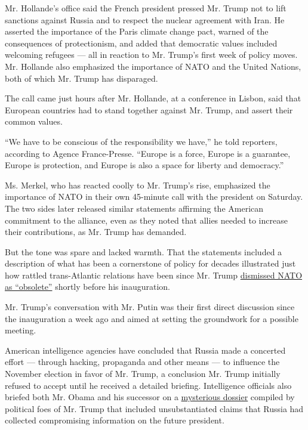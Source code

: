 Mr. Hollande's office said the French president pressed Mr. Trump not to
lift sanctions against Russia and to respect the nuclear agreement with
Iran. He asserted the importance of the Paris climate change pact,
warned of the consequences of protectionism, and added that democratic
values included welcoming refugees --- all in reaction to Mr. Trump's
first week of policy moves. Mr. Hollande also emphasized the importance
of NATO and the United Nations, both of which Mr. Trump has disparaged.

The call came just hours after Mr. Hollande, at a conference in Lisbon,
said that European countries had to stand together against Mr. Trump,
and assert their common values.

``We have to be conscious of the responsibility we have,'' he told
reporters, according to Agence France-Presse. ``Europe is a force,
Europe is a guarantee, Europe is protection, and Europe is also a space
for liberty and democracy.''

Ms. Merkel, who has reacted coolly to Mr. Trump's rise, emphasized the
importance of NATO in their own 45-minute call with the president on
Saturday. The two sides later released similar statements affirming the
American commitment to the alliance, even as they noted that allies
needed to increase their contributions, as Mr. Trump has demanded.

But the tone was spare and lacked warmth. That the statements included a
description of what has been a cornerstone of policy for decades
illustrated just how rattled trans-Atlantic relations have been since
Mr. Trump
\href{https://www.nytimes.com/2017/01/15/world/europe/donald-trump-nato.html}{dismissed
NATO as ``obsolete''} shortly before his inauguration.

Mr. Trump's conversation with Mr. Putin was their first direct
discussion since the inauguration a week ago and aimed at setting the
groundwork for a possible meeting.

American intelligence agencies have concluded that Russia made a
concerted effort --- through hacking, propaganda and other means --- to
influence the November election in favor of Mr. Trump, a conclusion Mr.
Trump initially refused to accept until he received a detailed briefing.
Intelligence officials also briefed both Mr. Obama and his successor on
a
\href{https://www.nytimes.com/2017/01/11/us/politics/trump-intelligence-report-explainer.html}{mysterious
dossier} compiled by political foes of Mr. Trump that included
unsubstantiated claims that Russia had collected compromising
information on the future president.

